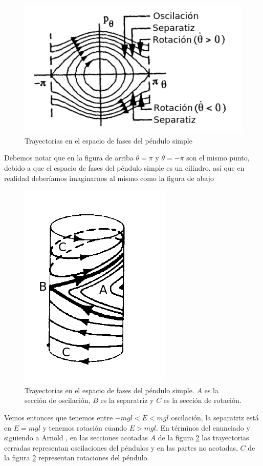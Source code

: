 \documentclass[a4paper,10pt]{article}
\numberwithin{equation}{section}
\begin{document}
\begin{figure}[H]
 \center 
 \includegraphics[scale=0.6]{problema5fig2}
 \caption{Trayectorias en el espacio de fases del péndulo simple}
 \label{fig:problema5fig2}
\end{figure}

Debemos notar que en la figura de arriba $\theta = \pi$ y  $\theta = -\pi$ son el 
mismo punto, debido a que el espacio de fases del péndulo simple es un cilindro, 
así que en realidad deberíamos imaginarnos al mismo como la figura de abajo 

\begin{figure}[H]
 \center 
 \includegraphics[scale=0.5]{problema5fig3}
 \caption{Trayectorias en el espacio de fases del péndulo simple. $A$ es la sección 
 de oscilación, $B$ es la separatriz y $C$ es la sección de rotación.}
 \label{fig:problema5fig3}
\end{figure}

Vemos entonces que tenemos entre $-mgl < E < mgl$ oscilación, la separatriz está 
en $E = mgl$ y tenemos rotación cuando $E > mgl$. En términos del enunciado y siguiendo 
a Arnold \cite{arnold}, en las secciones acotadas $A$ de la figura \ref{fig:problema5fig3} 
las trayectorias cerradas representan oscilaciones del péndulos y en las partes 
no acotadas, $C$ de la figura \ref{fig:problema5fig3} representan rotaciones del 
péndulo. 
\end{document}
